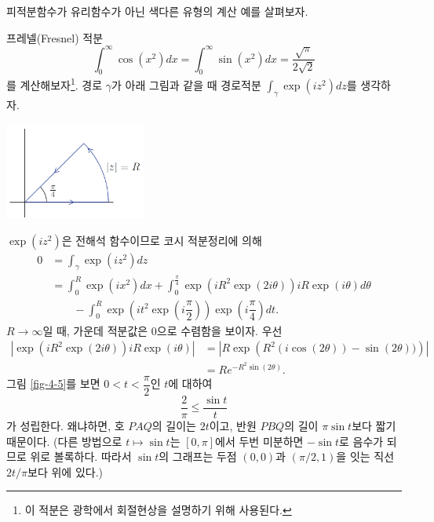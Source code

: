 피적분함수가 유리함수가 아닌 색다른  유형의 계산 예를 살펴보자.

\begin{saltexample}[label=example-4-20]{프레넬(Fresnel) 적분}{} 
\[
\int_0^\infty \cos(x^2) dx =  \int_0^\infty \sin(x^2) dx 
= \dfrac{\sqrt{\pi}}{2\sqrt{2}}
\]
를 계산해보자\footnote{
이 적분은 광학에서 회절현상을 설명하기 위해 사용된다.
}.
경로 $\gamma$가 아래 그림과 같을 때
경로적분 $\int_\gamma \exp(iz^2) dz$를 생각하자.

\begin{center}
\includegraphics[width=0.35\textwidth]{./SaltChapter/figs/fig-4-0-13}
\end{center}

$\exp(iz^2)$은 전해석 함수이므로
코시 적분정리에 의해
\begin{align*}
0 &= \int_\gamma \exp(iz^2) dz \\
& = \int_0^R \exp(ix^2)dx 
+ \int_0^{\frac\pi4} \exp(iR^2\exp(2i\theta))iR\exp(i\theta)d\theta \\
&\quad\quad 
- \int_0^R \exp\left( it^2\exp\left(i\dfrac\pi2\right)\right) 
\exp\left( i\dfrac\pi4\right)dt.
\end{align*}
$R\to\infty$일 때, 가운데 적분값은 $0$으로 수렴함을 보이자.
우선 
\begin{align*}
\left|  \exp(iR^2\exp(2i\theta))iR\exp(i\theta)  \right|
&= \left| R\exp\left(R^2(i\cos(2\theta)) - \sin(2\theta))\right) \right| \\
&= Re^{-R^2\sin(2\theta)}.
\end{align*}
그림 \ref{fig-4-5}를 보면 $0<t<\dfrac\pi2$인 $t$에 대하여
\[
\dfrac2\pi \le \dfrac{\sin t}t
\]
가 성립한다. 왜냐하면, 호 $PAQ$의 길이는 $2t$이고,
반원 $PBQ$의 길이 $\pi\sin t$보다 짧기 때문이다.
(다른 방법으로 $t\mapsto \sin t$는 $[0,\pi]$에서 
두번 미분하면 $-\sin t$로 음수가 되므로 위로 볼록하다.
따라서 $\sin t$의 그래프는 두점 $(0,0)$과 $(\pi/2,1)$을 잇는 직선 $2t/\pi$보다 위에 있다.)



\end{saltexample}
